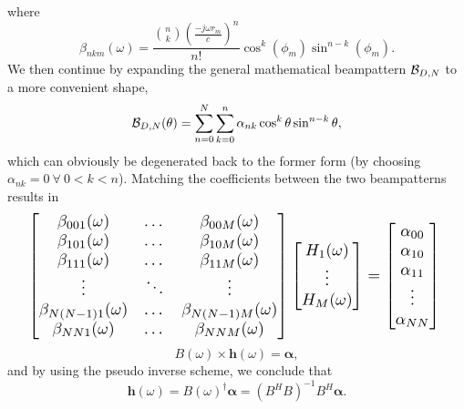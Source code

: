 \documentclass{article}
\begin{document}
where 
\begin{equation}\label{EqLbl_BetankDef}
	\beta_{nkm}(\omega)=\frac{\binom{n}{k}\left(\frac{-j\omega r_m}{c}\right)^n}{n!}\cos^k(\phi_m)\sin^{n-k}(\phi_m).
\end{equation}
We then continue by expanding the general mathematical beampattern $ {\cal B}_{D,N} $ to a more convenient shape,
\begin{equation}
{\cal B}_{D,N}(\theta)=\sum_{n=0}^{N}\sum_{k=0}^{n}\alpha_{nk}\cos^k{\theta}\sin^{n-k}{\theta},
\end{equation} 
which can obviously be degenerated back to the former form (by choosing $ \alpha_{nk}=0 \ \forall \ 0<k<n $). Matching the coefficients between the two beampatterns results in 
\[\resizebox{0.95\columnwidth}{!}{$\displaystyle
	\begin{bmatrix}
	\beta_{001}(\omega) 	& \dots 		& \beta_{00M}(\omega)\\
	\beta_{101}(\omega) 	& \dots 		& \beta_{10M}(\omega)\\
	\beta_{111}(\omega) 	& \dots 		& \beta_{11M}(\omega)\\
	\vdots			& \ddots 		& \vdots\\
	\beta_{N(N-1)1}(\omega) & \dots 		& \beta_{N(N-1)M}(\omega)\\
	\beta_{NN1}(\omega) 	& \dots 		& \beta_{NNM}(\omega)\\
	\end{bmatrix}
	\begin{bmatrix}
	H_1(\omega)\\ \vdots \\ H_M(\omega)
	\end{bmatrix}
	=
	\begin{bmatrix}
	\alpha_{00}\\
	\alpha_{10}\\
	\alpha_{11}\\
	\vdots \\
	\alpha_{NN}\\
	\end{bmatrix}
	$
}
\] 
\begin{equation}\label{EqnLbl_BpCoefExpr}
B(\omega)\times\boldsymbol{h}(\omega)	= \boldsymbol{\alpha},
\end{equation} 
and by using the pseudo inverse scheme, we conclude that 
\begin{equation}\label{EqnLbl_BpCoefExpr}
\boldsymbol{h}(\omega)	= B(\omega)^{\dagger}\boldsymbol{\alpha} = \left(B^HB\right)^{-1}B^H\boldsymbol{\alpha}.
\end{equation} 
\end{document}
